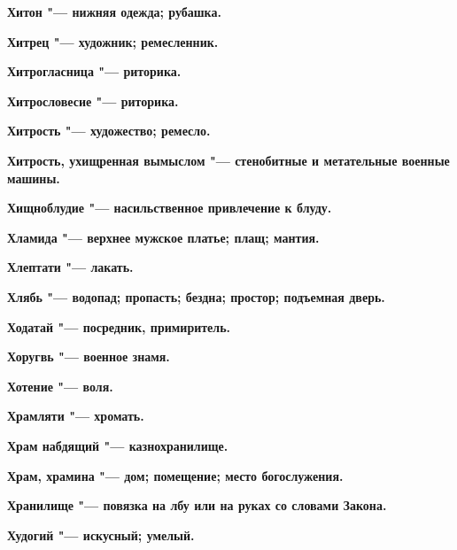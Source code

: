 \begin{mymulticols}{2}
\bfseries Хитон\normalfont{} "--- нижняя одежда; рубашка. 




\bfseries Хитрец\normalfont{} "--- художник; ремесленник. 




\bfseries Хитрогласница\normalfont{} "--- риторика. 




\bfseries Хитрословесие\normalfont{} "--- риторика. 




\bfseries Хитрость\normalfont{} "--- художество; ремесло. 




\bfseries Хитрость, ухищренная вымыслом\normalfont{} "--- стенобитные и метательные военные машины. 




\bfseries Хищноблудие\normalfont{} "--- насильственное привлечение к блуду. 




\bfseries Хламида\normalfont{} "--- верхнее мужское платье; плащ; мантия. 




\bfseries Хлептати\normalfont{} "--- лакать. 




\bfseries Хлябь\normalfont{} "--- водопад; пропасть; бездна; простор; подъемная дверь. 




\bfseries Ходатай\normalfont{} "--- посредник, примиритель. 




\bfseries Хоругвь\normalfont{} "--- военное знамя. 




\bfseries Хотение\normalfont{} "--- воля. 




\bfseries Храмляти\normalfont{} "--- хромать. 




\bfseries Храм набдящий\normalfont{} "--- казнохранилище. 




\bfseries Храм, храмина\normalfont{} "--- дом; помещение; место богослужения. 




\bfseries Хранилище\normalfont{} "--- повязка на лбу или на руках со словами Закона. 




\bfseries Худогий\normalfont{} "--- искусный; умелый. 





\end{mymulticols}
